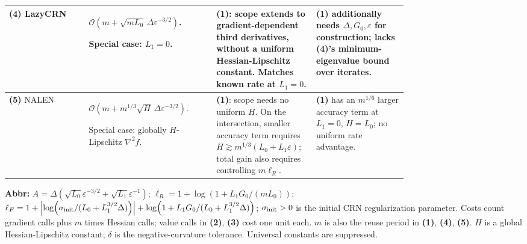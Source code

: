 \begin{table}[tp]
\begin{threeparttable}
\begin{tabularx}{\linewidth}{@{}>{\raggedright\arraybackslash}p{0.20\linewidth}>{\raggedright\arraybackslash}p{0.32\linewidth}>{\raggedright\arraybackslash}p{0.25\linewidth}>{\raggedright\arraybackslash}X@{}}
\midrule
\textbf{(4)} LazyCRN \citep[Thm.~3.1, Cor.~3.6]{gdhDoikov2023}
& $\mathcal{O}\!\left(m+\sqrt{mL_0}\,\Delta\varepsilon^{-3/2}\right)$.
\par Special case: $L_1=0$.
& \textbf{(1)}: scope extends to gradient-dependent third derivatives, without a uniform Hessian-Lipschitz constant. Matches known rate at $L_1=0$.
& \textbf{(1)} additionally needs $\Delta,G_0,\varepsilon$ for construction; lacks \textbf{(4)}'s minimum-eigenvalue bound over iterates. \\
\midrule
\textbf{(5)} NALEN \citep[Thm.~4.1]{gdhChen2026v3}
& $\mathcal{O}\!\left(m+m^{1/3}\sqrt H\,\Delta\varepsilon^{-3/2}\right)$.
\par Special case: globally $H$-Lipschitz $\nabla^2f$.
& \textbf{(1)}: scope needs no uniform $H$. On the intersection, smaller accuracy term requires $H\gtrsim m^{1/3}(L_0+L_1\varepsilon)$; total gain also requires controlling $m\ell_R$.
& \textbf{(1)} has an $m^{1/6}$ larger accuracy term at $L_1=0$, $H=L_0$; no uniform rate advantage. \\
\bottomrule
\end{tabularx}
\begin{tablenotes}[flushleft]\footnotesize
\item[] \textbf{Abbr:} $A=\Delta(\sqrt{L_0}\varepsilon^{-3/2}+\sqrt{L_1}\varepsilon^{-1})$; $\ell_R=1+\log(1+L_1G_0/(mL_0))$; $\ell_F=1+\left|\log\!\left(\sigma_{\rm init}/(L_0+L_1^{3/2}\Delta)\right)\right|+\log\!\left(1+L_1G_0/(L_0+L_1^{3/2}\Delta)\right)$; $\sigma_{\rm init}>0$ is the initial CRN regularization parameter. Costs count gradient calls plus $m$ times Hessian calls; value calls in \textbf{(2)}, \textbf{(3)} cost one unit each. $m$ is also the reuse period in \textbf{(1)}, \textbf{(4)}, \textbf{(5)}. $H$ is a global Hessian-Lipschitz constant; $\delta$ is the negative-curvature tolerance. Universal constants are suppressed.
\end{tablenotes}
\end{threeparttable}
\end{table}
\clearpage
